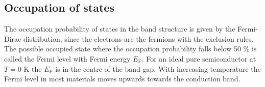\subsection{Occupation of states}
The occupation probability of states in the band structure is given by the Fermi-Dirac distribution, since the electrons are the fermions with the exclusion rules. The possible occupied state where the occupation probability falls below 50 $\%$ is called the Fermi level with Fermi energy $E_{\textrm{F}}$. 
For an ideal pure semiconductor at $T=0$ K the $E_{\textrm{F}}$ is in the centre of the band gap. With increasing temperature the Fermi level in most materials moves upwards towards the conduction band.


